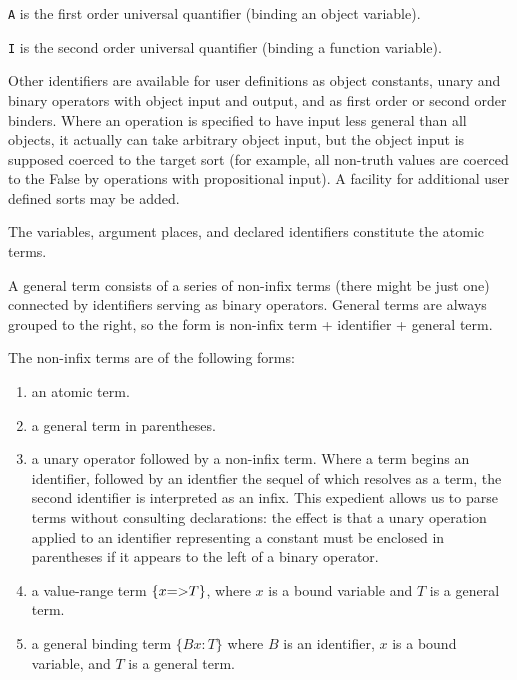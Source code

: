 \documentclass{article}
\begin{document}
{{\begin{description}
\item {\tt A} is the first order universal quantifier (binding an object variable).

\item {\tt I} is the second order universal quantifier (binding a function variable).

\end{description}

Other identifiers are available for user definitions as object constants, unary and binary operators with object input and output,
and as first order or second order binders.  Where an operation is specified to have input less general than all objects, it actually
can take arbitrary object input, but the object input is supposed coerced to the target sort (for example, all non-truth values are coerced to the False
by operations with propositional input).  A facility for additional user defined sorts may be added.

The variables, argument places, and declared identifiers constitute the atomic terms.

A general term consists of a series of non-infix terms (there might be just one)  connected by identifiers serving as binary operators.  General terms are always grouped to the right, so the form is non-infix term + identifier + general term.

The non-infix terms are of the following forms:

\begin{enumerate}

\item an atomic term.

\item a general term in parentheses.

\item a unary operator followed by a non-infix term.   Where a term begins an identifier, followed by an identfier the sequel of which resolves as a term,
the second identifier is interpreted as an infix.  This expedient allows us to parse terms without consulting declarations:  the effect is that a unary operation applied to an identifier representing a constant must be enclosed in parentheses if it appears to the left of a binary operator.

\item a value-range term $\{x {\tt =>} T\}$, where $x$ is a bound variable and $T$ is a general term.

\item a general binding term $\{B x:T\}$ where $B$ is an identifier, $x$ is a bound variable, and $T$ is a general term.


\end{enumerate}}}
\end{document}
